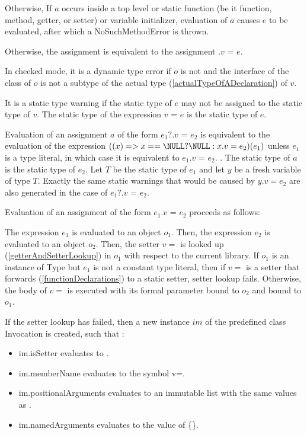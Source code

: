 \documentclass{article}
\newcommand{\code}[1]{{\sf #1}}
\begin{document}
\LMHash{}
Otherwise, If  $a$ occurs inside a top level or static function (be it function, method, getter,  or setter) or variable initializer, evaluation of $a$ causes $e$ to be evaluated, after which a \code{NoSuchMethodError} is thrown. 

\LMHash{}
Otherwise, the assignment is equivalent to the assignment \code{ \THIS{}.$v$ = $e$}. 

\LMHash{}
In checked mode, it is a dynamic type error if $o$ is not \NULL{} and the interface of the class of $o$ is not a subtype of the actual type (\ref{actualTypeOfADeclaration}) of $v$.

\LMHash{}
It is a static type warning if the static type of $e$ may not be assigned to the static type of $v$. The static type of the expression $v$ \code{=} $e$ is the static type of $e$.

\LMHash{}
Evaluation of an assignment $a$ of the form $e_1?.v$ \code{=} $e_2$ is equivalent to the evaluation of the expression $((x) => x == \NULL? \NULL: x.v = e_2)(e_1)$
 unless $e_1$ is  a type literal, in which case it is equivalent to $e_1.v$ \code{=} $e_2$.
. The static type of $a$ is the static type of $e_2$. Let $T$ be the static type of $e_1$ and let $y$ be a fresh variable of type $T$. Exactly the same static warnings that would be caused by $y.v = e_2$ are also generated in the case of $e_1?.v$ \code{=} $e_2$.

\LMHash{}
Evaluation of an assignment of the form $e_1.v$ \code{=} $e_2$ proceeds as follows:

\LMHash{}
The expression $e_1$ is evaluated to an object $o_1$. Then, the expression $e_2$  is evaluated to an object $o_2$. Then, the setter $v=$ is looked up (\ref{getterAndSetterLookup}) in $o_1$ with respect to the current library.  If $o_1$ is an instance of \code{Type} but $e_1$ is not a constant type literal, then if $v=$ is a setter that forwards (\ref{functionDeclarations}) to a static setter, setter lookup fails. Otherwise, the body  of $v=$ is executed with its formal parameter bound to $o_2$ and \THIS{} bound to $o_1$. 

\LMHash{}
If the setter lookup has failed, then a new instance $im$  of the predefined class  \code{Invocation}  is created, such that :
\begin{itemize}
\item  \code{im.isSetter} evaluates to \code{\TRUE{}}.
\item  \code{im.memberName} evaluates to the symbol \code{v=}.
\item \code{im.positionalArguments} evaluates to an immutable list with the same values as \code{[$o_2$]}.
\item \code{im.namedArguments} evaluates to the value of \code{\CONST{} \{\}}.
\end{itemize}
\end{document}
